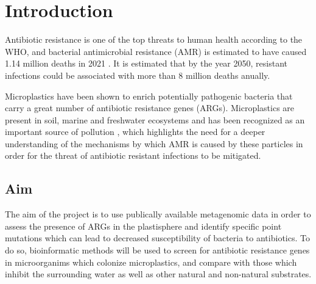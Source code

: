 \chapter{Introduction}

Antibiotic resistance is one of the top threats to human health according to the WHO\cite{worldhealthorganization2023AntimicrobialResistance}, and bacterial antimicrobial resistance (AMR) is estimated to have caused 1.14 million deaths in 2021 \cite{naghavi2024GlobalBurdenBacterial}. 
It is estimated that by the year 2050, resistant infections could be associated  with more than 8 million deaths anually\cite{naghavi2024GlobalBurdenBacterial}.

Microplastics have been shown to enrich potentially pathogenic bacteria that carry a great number of antibiotic resistance genes (ARGs)\cite{liu2021MicroplasticsAreHotspot, wu2019SelectiveEnrichmentBacterial}.
Microplastics are present in soil, marine and freshwater ecosystems and has been recognized as an important source of pollution \cite{ziani2023MicroplasticsRealGlobal},
which highlights the need for a deeper understanding of the mechanisms by which AMR is caused by these particles in order for the threat of antibiotic resistant infections to be mitigated. 






\section{Aim} %
The aim of the project is to use publically available metagenomic data in order to assess the presence of ARGs in the plastisphere and identify specific point mutations which can lead to decreased susceptibility of bacteria to antibiotics.
To do so, bioinformatic methods will be used to screen for antibiotic resistance genes in microorganims which colonize microplastics, and compare with those which inhibit the surrounding water as well as other natural and non-natural substrates.

